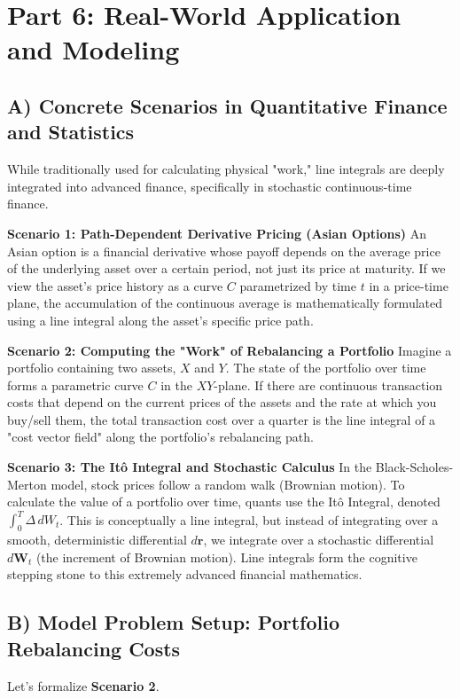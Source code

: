 \documentclass{article}
\begin{document}
\newpage

\section{Part 6: Real-World Application and Modeling}

\subsection{A) Concrete Scenarios in Quantitative Finance and Statistics}
While traditionally used for calculating physical "work," line integrals are deeply integrated into advanced finance, specifically in stochastic continuous-time finance.

\textbf{Scenario 1: Path-Dependent Derivative Pricing (Asian Options)}
An Asian option is a financial derivative whose payoff depends on the average price of the underlying asset over a certain period, not just its price at maturity. If we view the asset's price history as a curve $C$ parametrized by time $t$ in a price-time plane, the accumulation of the continuous average is mathematically formulated using a line integral along the asset's specific price path.

\textbf{Scenario 2: Computing the "Work" of Rebalancing a Portfolio}
Imagine a portfolio containing two assets, $X$ and $Y$. The state of the portfolio over time forms a parametric curve $C$ in the $XY$-plane. If there are continuous transaction costs that depend on the current prices of the assets and the rate at which you buy/sell them, the total transaction cost over a quarter is the line integral of a "cost vector field" along the portfolio's rebalancing path.

\textbf{Scenario 3: The It\^o Integral and Stochastic Calculus}
In the Black-Scholes-Merton model, stock prices follow a random walk (Brownian motion). To calculate the value of a portfolio over time, quants use the It\^o Integral, denoted $\int_0^T \Delta \, dW_t$. This is conceptually a line integral, but instead of integrating over a smooth, deterministic differential $d\mathbf{r}$, we integrate over a stochastic differential $d\mathbf{W}_t$ (the increment of Brownian motion). Line integrals form the cognitive stepping stone to this extremely advanced financial mathematics.

\subsection{B) Model Problem Setup: Portfolio Rebalancing Costs}
Let's formalize \textbf{Scenario 2}. 
\end{document}
